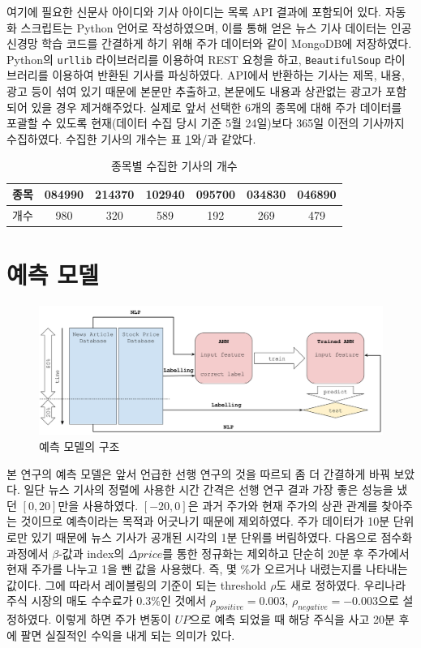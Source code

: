 \documentclass[a4paper,10pt]{article}
\begin{document}
여기에 필요한 신문사 아이디와 기사 아이디는 목록 API 결과에 포함되어 있다.
자동화 스크립트는 Python 언어로 작성하였으며, 이를 통해 얻은 뉴스 기사 데이터는 인공 신경망 학습 코드를 간결하게 하기 위해 주가 데이터와 같이 MongoDB에 저장하였다.
Python의 \texttt{urllib} 라이브러리를 이용하여 REST 요청을 하고, \texttt{BeautifulSoup} 라이브러리를 이용하여 반환된 기사를 파싱하였다.
API에서 반환하는 기사는 제목, 내용, 광고 등이 섞여 있기 때문에 본문만 추출하고, 본문에도 내용과 상관없는 광고가 포함되어 있을 경우 제거해주었다.
실제로 앞서 선택한 6개의 종목에 대해 주가 데이터를 포괄할 수 있도록 현재(데이터 수집 당시 기준 5월 24일)보다 365일 이전의 기사까지 수집하였다.
수집한 기사의 개수는 표 \ref{tbl:number_of_articles}와/과 같았다.
\begin{table}[h]
\begin{tabular}{|c||c|c|c|c|c|c|}
\hline
종목 & 084990 & 214370 & 102940 & 095700 & 034830 & 046890 \\
\hline
개수 & 980 & 320 & 589 & 192 & 269 & 479 \\
\hline
\end{tabular}
\centering
\caption{종목별 수집한 기사의 개수}
\label{tbl:number_of_articles}
\end{table}

\section{예측 모델}

\begin{figure}[h]
\includegraphics[width=\textwidth]{model}
\centering
\caption{예측 모델의 구조}
\label{fig:model}
\end{figure}

본 연구의 예측 모델은 앞서 언급한 선행 연구의 것을 따르되 좀 더 간결하게 바꿔 보았다.
일단 뉴스 기사의 정렬에 사용한 시간 간격은 선행 연구 결과 가장 좋은 성능을 냈던 $[0, 20]$만을 사용하였다.
$[-20, 0]$은 과거 주가와 현재 주가의 상관 관계를 찾아주는 것이므로 예측이라는 목적과 어긋나기 때문에 제외하였다.
주가 데이터가 10분 단위로만 있기 때문에 뉴스 기사가 공개된 시각의 1분 단위를 버림하였다.
다음으로 점수화 과정에서 $\beta$-값과 index의 $\Delta price$를 통한 정규화는 제외하고 단순히 20분 후 주가에서 현재 주가를 나누고 1을 뺀 값을 사용했다.
즉, 몇 \%가 오르거나 내렸는지를 나타내는 값이다.
그에 따라서 레이블링의 기준이 되는 threshold $\rho$도 새로 정하였다.
우리나라 주식 시장의 매도 수수료가 $0.3\%$인 것에서 $\rho_{positive}=0.003$, $\rho_{negative}=-0.003$으로 설정하였다.
이렇게 하면 주가 변동이 $UP$으로 예측 되었을 때 해당 주식을 사고 20분 후에 팔면 실질적인 수익을 내게 되는 의미가 있다.
\end{document}
